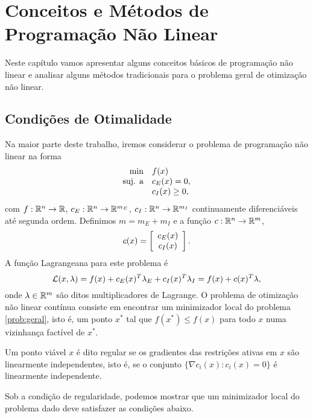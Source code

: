 \chapter{Conceitos e Métodos de Programação Não Linear}

Neste capítulo vamos apresentar alguns conceitos básicos de programação não
linear e analisar alguns métodos tradicionais para o problema geral de
otimização não linear.

\section{Condições de Otimalidade}

Na maior parte deste trabalho, iremos considerar o problema de programação não
linear na forma
\begin{equation}\visiblelbl{prob:geral}
 \begin{array}{rl}
  \min & f(x) \\
   \mbox{suj. a} & c_E(x) =  0, \\
               & c_I(x) \geq 0,
 \end{array}
\end{equation}
com $f:\mathbb{R}^{n}\to\mathbb{R}$, $c_E:\mathbb{R}^{n}\to\mathbb{R}^{m_E}$, $c_I:\mathbb{R}^{n}\to\mathbb{R}^{m_I}$
continuamente diferenciáveis até segunda ordem. Definimos $m = m_E+m_I$ e a
função $c:\mathbb{R}^{n}\to\mathbb{R}^{m}$, $$ c(x) = \left[\begin{array}{c}c_E(x) \\ c_I(x)\end{array}\right]. $$
A função Lagrangeana para este problema é
\begin{equation}
  \mathcal{L}(x,\lambda) = f(x) + c_E(x)^T\lambda_E + c_I(x)^T\lambda_I = f(x)
    + c(x)^T\lambda,
  \visiblelbl{def:lagrgeral}
\end{equation}
onde $\lambda \in\mathbb{R}^{m}$ são ditos multiplicadores de Lagrange.
O problema de otimização não linear contínua consiste em encontrar um
minimizador local do problema \eqref{prob:geral}, isto é, um ponto $x^*$ tal que
$f(x^*) \leq f(x)$ para todo $x$ numa vizinhança factível de $x^*$.
\begin{definition}[Regularidade]
  Um ponto viável $x$ é dito regular se os gradientes das restrições ativas em $x$ são
  linearmente independentes, isto é, se o conjunto $\{\nabla c_i(x): c_i(x) =
  0\}$ é linearmente independente.
\end{definition}
Sob a condição de regularidade, podemos mostrar que um minimizador local do
problema dado deve satisfazer as condições abaixo.

